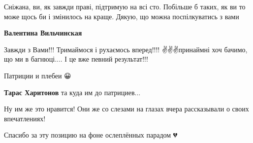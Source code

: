 \begin{itemize}
Сніжана, ви, як завжди праві, підтримую на всі сто. Побільше б таких, як ви то може
щось би і змінилось на краще. Дякую, що можна поспілкуватись з вами

\begin{itemize}
 
\textbf{Валентина Вильчинская} 

Завжди з Вами!!!
Тримаймося і рухаємось вперед!!!! ✌️✌️✌️принаймні хоч бачимо, що ми в багнюці....
І це вже певний результат!!!
\end{itemize}

 
Патриции и плебеи 😀

 
\textbf{Тарас Харитонов} та куда им до патрициев...

 
Ну им же это нравится! Они же со слезами на глазах вчера рассказывали о своих впечатлениях!

 
Спасибо за эту позицию на фоне ослеплённых парадом 💔

\begin{itemize}
 

\end{itemize}
\end{itemize}
